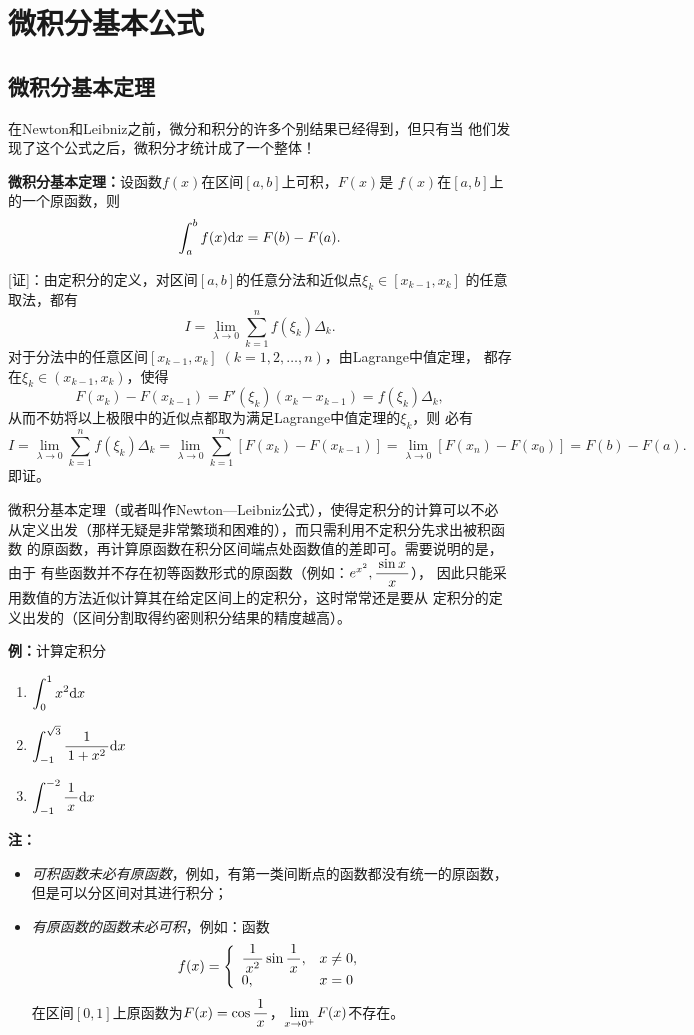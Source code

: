 \section{微积分基本公式}

\subsection{微积分基本定理}

在Newton和Leibniz之前，微分和积分的许多个别结果已经得到，但只有当
他们发现了这个公式之后，微积分才统计成了一个整体！

\begin{thx}
	{\bf 微积分基本定理：}设函数$f(x)$在区间$[a,b]$上可积，$F(x)$是
	$f(x)$在$[a,b]$上的一个原函数，则
	$$\displaystyle\int_a^bf(x)\mathrm{d} x=F(b)-F(a).$$
\end{thx}

[证]：由定积分的定义，对区间$[a,b]$的任意分法和近似点$\xi_k\in[x_{k-1},x_k]$
的任意取法，都有
$$I=\lim\limits_{\lambda\to 0}\sum\limits_{k=1}^nf(\xi_k)\Delta_k.$$
对于分法中的任意区间$[x_{k-1},x_k]\;(k=1,2,\ldots,n)$，由Lagrange中值定理，
都存在$\xi_k\in(x_{k-1},x_k)$，使得
$$F(x_k)-F(x_{k-1})=F'(\xi_k)(x_k-x_{k-1})=f(\xi_k)\Delta_k,$$
从而不妨将以上极限中的近似点都取为满足Lagrange中值定理的$\xi_k$，则
必有
$$I=\lim\limits_{\lambda\to 0}\sum\limits_{k=1}^nf(\xi_k)\Delta_k
=\lim\limits_{\lambda\to 0}\sum\limits_{k=1}^n[F(x_k)-F(x_{k-1})]
=\lim\limits_{\lambda\to 0}[F(x_n)-F(x_0)]=F(b)-F(a).$$
即证。\fin

微积分基本定理（或者叫作Newton—Leibniz公式），使得定积分的计算可以不必
从定义出发（那样无疑是非常繁琐和困难的），而只需利用不定积分先求出被积函数
的原函数，再计算原函数在积分区间端点处函数值的差即可。需要说明的是，由于
有些函数并不存在初等函数形式的原函数（例如：$e^{x^2},\displaystyle\frac{\,{\sin x}\,}{\,{x}\,}$），
因此只能采用数值的方法近似计算其在给定区间上的定积分，这时常常还是要从
定积分的定义出发的（区间分割取得约密则积分结果的精度越高）。

{\bf 例：}计算定积分
\begin{enumerate}[(1)]
  \setlength{\itemindent}{1cm}
  \item $\displaystyle\int_{0}^{1}x^2 \mathrm{d} x$
  \item $\displaystyle\int_{-1}^{\sqrt 3}\displaystyle\frac{\,{1}\,}{\,{1+x^2}\,}\mathrm{d} x$
  \item $\displaystyle\int_{-1}^{-2}\displaystyle\frac{\,{1}\,}{\,{x}\,}\mathrm{d} x$
\end{enumerate}

{\bf 注：}
\begin{itemize}
  \setlength{\itemindent}{1cm}
  \item {\it 可积函数未必有原函数}，例如，有第一类间断点的函数都没有统一的原函数，
  但是可以分区间对其进行积分；
  \item {\it 有原函数的函数未必可积}，例如：函数
  $$f(x)=\left\{\begin{array}{ll}
  \displaystyle\frac{\,{1}\,}{\,{x^2}\,}\sin\displaystyle\frac{\,{1}\,}{\,{x}\,},& x\ne0,\\ 0,& x=0
  \end{array}\right.$$
  在区间$[0,1]$上原函数为$F(x)=\cos\displaystyle\frac{\,{1}\,}{\,{x}\,}$，$\lim\limits_{x\to{0^+}}F(x)$不存在。
\end{itemize}

